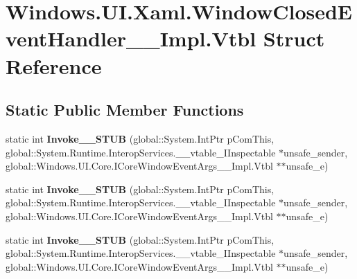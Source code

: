 \hypertarget{struct_windows_1_1_u_i_1_1_xaml_1_1_window_closed_event_handler_____impl_1_1_vtbl}{}\section{Windows.\+U\+I.\+Xaml.\+Window\+Closed\+Event\+Handler\+\_\+\+\_\+\+Impl.\+Vtbl Struct Reference}
\label{struct_windows_1_1_u_i_1_1_xaml_1_1_window_closed_event_handler_____impl_1_1_vtbl}
\subsection*{Static Public Member Functions}
\begin{DoxyCompactItemize}
\item 
\mbox{\label{struct_windows_1_1_u_i_1_1_xaml_1_1_window_closed_event_handler_____impl_1_1_vtbl_a428b2618cba654721284ecccf5b4448f}} 
static int {\bfseries Invoke\+\_\+\+\_\+\+S\+T\+UB} (global\+::\+System.\+Int\+Ptr p\+Com\+This, global\+::\+System.\+Runtime.\+Interop\+Services.\+\_\+\+\_\+vtable\+\_\+\+I\+Inspectable $\ast$unsafe\+\_\+sender, global\+::\+Windows.\+U\+I.\+Core.\+I\+Core\+Window\+Event\+Args\+\_\+\+\_\+\+Impl.\+Vtbl $\ast$$\ast$unsafe\+\_\+e)
\item 
\mbox{\label{struct_windows_1_1_u_i_1_1_xaml_1_1_window_closed_event_handler_____impl_1_1_vtbl_a428b2618cba654721284ecccf5b4448f}} 
static int {\bfseries Invoke\+\_\+\+\_\+\+S\+T\+UB} (global\+::\+System.\+Int\+Ptr p\+Com\+This, global\+::\+System.\+Runtime.\+Interop\+Services.\+\_\+\+\_\+vtable\+\_\+\+I\+Inspectable $\ast$unsafe\+\_\+sender, global\+::\+Windows.\+U\+I.\+Core.\+I\+Core\+Window\+Event\+Args\+\_\+\+\_\+\+Impl.\+Vtbl $\ast$$\ast$unsafe\+\_\+e)
\item 
\mbox{\label{struct_windows_1_1_u_i_1_1_xaml_1_1_window_closed_event_handler_____impl_1_1_vtbl_a428b2618cba654721284ecccf5b4448f}} 
static int {\bfseries Invoke\+\_\+\+\_\+\+S\+T\+UB} (global\+::\+System.\+Int\+Ptr p\+Com\+This, global\+::\+System.\+Runtime.\+Interop\+Services.\+\_\+\+\_\+vtable\+\_\+\+I\+Inspectable $\ast$unsafe\+\_\+sender, global\+::\+Windows.\+U\+I.\+Core.\+I\+Core\+Window\+Event\+Args\+\_\+\+\_\+\+Impl.\+Vtbl $\ast$$\ast$unsafe\+\_\+e)
$$
\end{DoxyCompactItemize}
